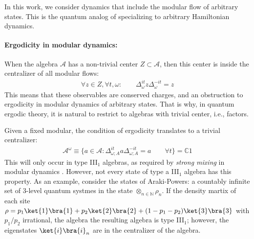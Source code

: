 \documentclass[a4paper,11pt]{article}
\theoremstyle{definition}
\newcommand{\mA}{\mathcal{A}}
\begin{document}
In this work, we consider dynamics that include the modular flow of arbitrary states. This is the quantum analog of specializing to arbitrary Hamiltonian dynamics.



\paragraph{Ergodicity in modular dynamics:}

When the algebra $\mA$ has a non-trivial center $Z\subset \mA$, then this center is inside the centralizer of all modular flows:
\begin{align}
    \forall z\in Z,\forall t,\omega:\qquad \Delta_{\omega}^{it}z \Delta_\omega^{-it}=z
\end{align}
This means that these observables are conserved charges, and an obstruction to ergodicity in modular dynamics of arbitrary states. That is why, in quantum ergodic theory, it is natural to restrict to algebras with trivial center, i.e., factors.

Given a fixed modular, the condition of ergodicity translates to a trivial centralizer:
\begin{align}
    \mA^\omega\equiv \{a\in \mA:\Delta_{\omega;A}^{it}a\Delta_{\omega;A}^{-it}=a\qquad \forall t\}=\mathbb{C} 1
\end{align}
This will only occur in type III$_1$ algebras, as required by {\it strong mixing} in modular dynamics \cite{}. However, not every state of type a III$_1$ algebra has this property. As an example, consider the states of Araki-Powers: a countably infinite set of 3-level quantum systmes in the state $\otimes_{n\in\mathbb{N}}\rho_n$. If the density martix of each site $\rho=p_1\ket{1}\bra{1}+p_2\ket{2}\bra{2}+(1-p_1-p_2)\ket{3}\bra{3}$ with $p_1/p_2$ irrational, the algebra the resulting algebra is type III$_1$; however, the eigenstates $\ket{i}\bra{i}_n$ are in the centralizer of the algebra.


\paragraph{}
\end{document}
